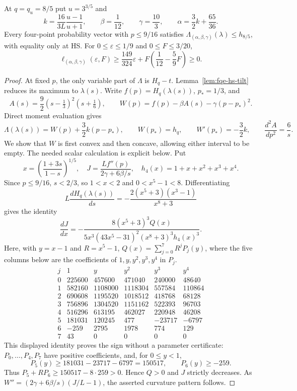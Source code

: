 \begin{lemma}\label{lem:fqe-hs-polynomial}
At $q=q_u=8/5$ put $u=3^{3/5}$ and
\[
 k=\frac{16}{3L}\frac{u-1}{u+1},\qquad
 \beta=\frac1{12},\qquad \gamma=\frac{10}3,\qquad
 \alpha=\frac32k+\frac{65}{36}.
\]
Every four-point probability vector with $p\le9/16$ satisfies
$\Lambda_{(\alpha,\beta,\gamma)}(\lambda)\le h_{8/5}$,
with equality only at HS. For $0\le\varepsilon\le1/9$ and
$0\le F\le3/20$,
\[
 \ell_{(\alpha,\beta,\gamma)}(\varepsilon,F)
 \ge\frac{149}{324}\varepsilon
       +F\left(\frac1{12}-\frac59F\right)\ge0.
\]
\end{lemma}
\begin{proof}
At fixed $p$, the only variable part of $\Lambda$ is $H_q-t$.
Lemma~\ref{lem:fqe-hs-tilt} reduces its maximum to $\lambda(s)$.
Write $f(p)=H_q(\lambda(s))$, $p_* =1/3$, and
\[
 A(s)=\frac92(s-\tfrac13)^2(s+\tfrac16),\qquad
 W(p)=f(p)-\beta A(s)-\gamma(p-p_*)^2.
\]
Direct moment evaluation gives
\[
 \Lambda(\lambda(s))=W(p)+\frac32k(p-p_*),\qquad
 W(p_*)=h_q,\qquad W'(p_*)=-\frac32k,
 \qquad \frac{d^2 A}{dp^2}=\frac6s.
\]
We show that $W$ is first convex and then concave, allowing either
interval to be empty. The needed scalar calculation is explicit below.
Put
\[
 x=\left(\frac{1+3s}{1-s}\right)^{1/5},\quad
 J=\frac{L f''(p)}{2\gamma+6\beta/s},\quad
 h_4(x)=1+x+x^2+x^3+x^4.
\]
Since $p\le9/16$, $s<2/3$, so $1<x<2$ and $0<x^5-1<8$.
Differentiating
\[
 L\frac{dH_q(\lambda(s))}{ds}
 =-\frac{2(x^5+3)(x^3-1)}{x^8+3}
\]
gives the identity
\[
 \frac{dJ}{dx}
 =-\frac{8(x^5+3)^3 Q(x)}
 {5x^3(43x^5-31)^2(x^8+3)^3h_4(x)^3}.
 \tag{HCJ}\label{eq:fqe-hs-curvature-identity}
\]
Here, with $y=x-1$ and $R=x^5-1$,
$Q(x)=\sum_{j=0}^7R^jP_j(y)$, where the five columns below are the
coefficients of $1,y,y^2,y^3,y^4$ in $P_j$.
\[
\begin{array}{c|rrrrr}
 j&1&y&y^2&y^3&y^4\\\hline
0&225600&457600&471040&240000&48640\\
1&582160&1108000&1118304&557584&110864\\
2&690608&1195520&1018512&418768&68128\\
3&756896&1304520&1151162&522393&96703\\
4&516296&613195&462027&220948&46208\\
5&181031&120245&477&-23717&-6797\\
6&-259&2795&1978&774&129\\
7&43&0&0&0&0
\end{array}
\]
This displayed identity proves the sign without a parameter certificate:
$P_0,\ldots,P_4,P_7$ have positive coefficients, and, for $0\le y<1$,
\[
 P_5(y)\ge181031-23717-6797=150517,\qquad P_6(y)\ge-259.
\]
Thus $P_5+RP_6\ge150517-8\cdot259>0$. Hence $Q>0$ and $J$ strictly decreases.
As $W''=(2\gamma+6\beta/s)(J/L-1)$, the asserted curvature pattern follows.


\end{proof}

